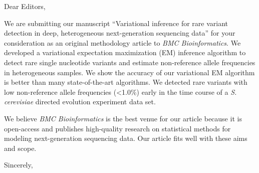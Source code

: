 \documentclass[11pt,letterpaper]{letter} %
\begin{document}
\vspace{\fill}
\begin{letter}{}

\opening{Dear Editors,}

We are submitting our manuscript ``Variational inference for rare variant detection in deep, heterogeneous next-generation sequencing data'' for your consideration as an original methodology article to \textit{BMC Bioinformatics}. 
We developed a variational expectation maximization (EM) inference algorithm to detect rare single nucleotide variants and estimate non-reference allele frequencies in heterogeneous samples.
We show the accuracy of our variational EM algorithm is better than many state-of-the-art algorithms. 
We detected rare variants with low non-reference allele frequencies (<1.0\%) early in the time course of a \textit{S. cerevisiae} directed evolution experiment data set.

We believe \textit{BMC Bioinformatics} is the best venue for our article because it is open-access and publishes high-quality research on statistical methods for modeling next-generation sequencing data.
Our article fits well with these aims and scope.

\closing{Sincerely,}

\vspace{\fill}
\end{letter}
\end{document}
